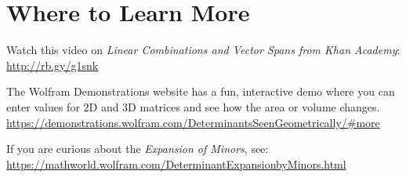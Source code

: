 \section{Where to Learn More}
Watch this video on \emph {Linear Combinations and Vector Spans from Khan 
Academy}: \url{http://rb.gy/g1snk}

The Wolfram Demonstrations website has a fun, interactive demo where you can 
enter values for 2D and 3D matrices and see how the area or volume changes. 
\url{https://demonstrations.wolfram.com/DeterminantsSeenGeometrically/#more}

If you are curious about the \emph {Expansion of Minors}, see:
\url {https://mathworld.wolfram.com/DeterminantExpansionbyMinors.html}